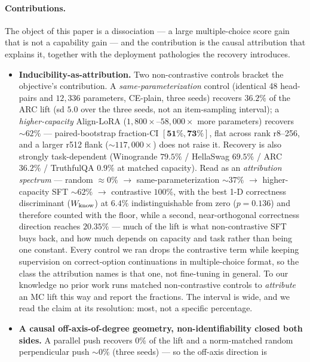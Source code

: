 \paragraph{Contributions.}
The object of this paper is a dissociation --- a large multiple-choice score gain
that is not a capability gain --- and the contribution is the causal attribution
that explains it, together with the deployment pathologies the recovery introduces.
\begin{itemize}[leftmargin=1.4em,itemsep=3pt]
\item \textbf{Inducibility-as-attribution.} Two non-contrastive controls bracket
  the objective's contribution. A \emph{same-parameterization} control (identical
  48 head-pairs and $12{,}336$ parameters, CE-plain, three seeds) recovers
  $\mathbf{36.2\%}$ of the ARC lift (sd $5.0$ over the three seeds, not an
  item-sampling interval); a \emph{higher-capacity} Align-LoRA
  ($1{,}800\times$--$58{,}000\times$ more parameters) recovers ${\sim}62\%$ ---
  paired-bootstrap fraction-CI $\boldsymbol{[51\%, 73\%]}$, flat across rank r8--256, and a
  larger r512 flank (${\sim}117{,}000\times$) does not raise it. Recovery is also strongly task-dependent
  (Winogrande $79.5\%$ / HellaSwag $69.5\%$ / ARC $36.2\%$ / TruthfulQA
  $\mathbf{0.9\%}$ at matched capacity). Read as an \emph{attribution spectrum} ---
  random ${\approx}0\%$ $\rightarrow$ same-parameterization ${\sim}37\%$
  $\rightarrow$ higher-capacity SFT ${\sim}62\%$ $\rightarrow$ contrastive $100\%$,
  with the best 1-D correctness discriminant ($W_{\mathrm{know}}$) at $6.4\%$ indistinguishable
  from zero ($p=0.136$) and therefore counted with the floor, while a second,
  near-orthogonal correctness direction reaches $20.35\%$ --- much of the lift is what
  non-contrastive SFT buys back, and how much depends on capacity and task rather
  than being one constant. Every control we ran drops the contrastive term while
  keeping supervision on correct-option continuations in multiple-choice format, so
  the class the attribution names is that one, not fine-tuning in general. To our knowledge no prior work runs matched
  non-contrastive controls to \emph{attribute} an MC lift this way and report the
  fractions. The interval is
  wide, and we read the claim at its resolution: most, not a specific percentage.
\item \textbf{A causal off-axis-of-degree geometry, non-identifiability closed both
  sides.} A parallel push recovers $0\%$ of the lift and a norm-matched random
  perpendicular push ${\sim}0\%$ (three seeds) --- so the off-axis direction is

\end{itemize}
